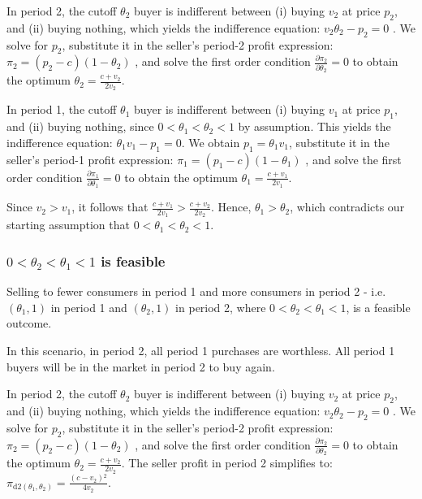 \documentclass[isre,blindrev]{informs3} %
\begin{document}
In period 2, the cutoff \(\theta _2\) buyer is indifferent between (i) buying \(v_2\) at price \(p_2\), and (ii) buying nothing, which yields the
indifference equation: \(v_2 \theta _2-p_2 = 0\) . We solve for \(p_2\), substitute it in the seller{'}s period-2 profit expression: \(\pi _2=\left(p_2-c\right)\left(1-\theta
_2\right)\) , and solve the first order condition \(\frac{\partial \pi _2}{\partial \theta _2}=0\) to obtain the optimum \(\theta _2=\frac{c+v_2}{2
v_2}\).

In period 1, the cutoff \(\theta _1\) buyer is indifferent between (i) buying \(v_1\) at price \(p_1\), and (ii) buying nothing, since \(0<\theta
_1<\theta _2<1\) by assumption. This { }yields the indifference equation: \(\theta _1v_1 - p_1 =0\). We obtain \(p_1=\theta _1v_1\), substitute
it in the seller{'}s period-1 profit expression: \(\pi _1=\left(p_1-c\right)\left(1-\theta _1\right)\) , and solve the first order condition \(\frac{\partial
\pi _1}{\partial \theta _1}=0\) to obtain the optimum \(\theta _1=\frac{c+v_1}{2 v_1}\). 

Since \(v_2>v_1\), it follows that  
\(\frac{c+v_1}{2 v_1}>\frac{c+v_2}{2 v_2}.\) Hence, \(\theta _1>\theta _2\),
which contradicts our starting assumption that \(0<\theta _1<\theta _2<1\).
\qedsymbol\\

\subsubsection{\(0<\theta _2<\theta _1<1\) is feasible}
\begin{lemma}
Selling to fewer consumers in period 1 and more consumers in period 2 - i.e. \(\left(\theta _1,1\right)\) { }in period 1 and { }\(\left(\theta
_2,1\right)\) in period 2, where \(0<\theta _2<\theta _1<1\), is a feasible outcome. { } 
\end{lemma}
In this scenario, in period 2, all period 1 purchases are worthless. All period 1 buyers will be in the market in period 2 to buy again.

In period 2, the cutoff \(\theta _2\) buyer is indifferent between (i) buying \(v_2\) at price \(p_2\), and (ii) buying nothing, which yields the
indifference equation: \(v_2 \theta _2-p_2 = 0\) . We solve for \(p_2\), substitute it in the seller{'}s period-2 profit expression: \(\pi _2=\left(p_2-c\right)\left(1-\theta
_2\right)\) , and solve the first order condition \(\frac{\partial \pi _2}{\partial \theta _2}=0\) to obtain the optimum \(\theta _2=\frac{c+v_2}{2
v_2}\). The seller profit in period 2 simplifies to: \(\pi _{\text{d2}\left(\theta _1,\theta _2\right)}=\frac{\left(c-v_2\right){}^2}{4 v_2}\).
\end{document}
